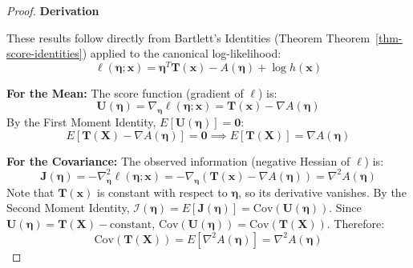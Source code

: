 \documentclass[
  letterpaper,
  DIV=11,
  numbers=noendperiod]{scrreprt}
\renewcommand{\[}{\begin{equation}}
\renewcommand{\]}{\end{equation}}
\theoremstyle{definition}
\theoremstyle{plain}
\theoremstyle{plain}
\theoremstyle{plain}
\theoremstyle{definition}
\theoremstyle{plain}
\theoremstyle{remark}
\begin{document}
\begin{proof}
\textbf{Derivation}

These results follow directly from Bartlett's Identities (Theorem
Theorem~\ref{thm-score-identities}) applied to the canonical
log-likelihood: \[
\ell(\boldsymbol{\eta}; \mathbf{x}) = \boldsymbol{\eta}^T \mathbf{T}(\mathbf{x}) - A(\boldsymbol{\eta}) + \log h(\mathbf{x})
\]

\textbf{For the Mean:} The score function (gradient of \(\ell\)) is: \[
\mathbf{U}(\boldsymbol{\eta}) = \nabla_{\boldsymbol{\eta}} \ell(\boldsymbol{\eta}; \mathbf{x}) = \mathbf{T}(\mathbf{x}) - \nabla A(\boldsymbol{\eta})
\] By the First Moment Identity,
\(E[\mathbf{U}(\boldsymbol{\eta})] = \mathbf{0}\): \[
E[\mathbf{T}(\mathbf{X}) - \nabla A(\boldsymbol{\eta})] = \mathbf{0} \implies E[\mathbf{T}(\mathbf{X})] = \nabla A(\boldsymbol{\eta})
\]

\textbf{For the Covariance:} The observed information (negative Hessian
of \(\ell\)) is: \[
\mathbf{J}(\boldsymbol{\eta}) = -\nabla^2_{\boldsymbol{\eta}} \ell(\boldsymbol{\eta}; \mathbf{x}) = -\nabla_{\boldsymbol{\eta}} (\mathbf{T}(\mathbf{x}) - \nabla A(\boldsymbol{\eta})) = \nabla^2 A(\boldsymbol{\eta})
\] Note that \(\mathbf{T}(\mathbf{x})\) is constant with respect to
\(\boldsymbol{\eta}\), so its derivative vanishes. By the Second Moment
Identity,
\(\mathcal{I}(\boldsymbol{\eta}) = E[\mathbf{J}(\boldsymbol{\eta})] = \text{Cov}(\mathbf{U}(\boldsymbol{\eta}))\).
Since
\(\mathbf{U}(\boldsymbol{\eta}) = \mathbf{T}(\mathbf{X}) - \text{constant}\),
\(\text{Cov}(\mathbf{U}(\boldsymbol{\eta})) = \text{Cov}(\mathbf{T}(\mathbf{X}))\).
Therefore: \[
\text{Cov}(\mathbf{T}(\mathbf{X})) = E[\nabla^2 A(\boldsymbol{\eta})] = \nabla^2 A(\boldsymbol{\eta})
\]
\end{proof}
\end{document}
